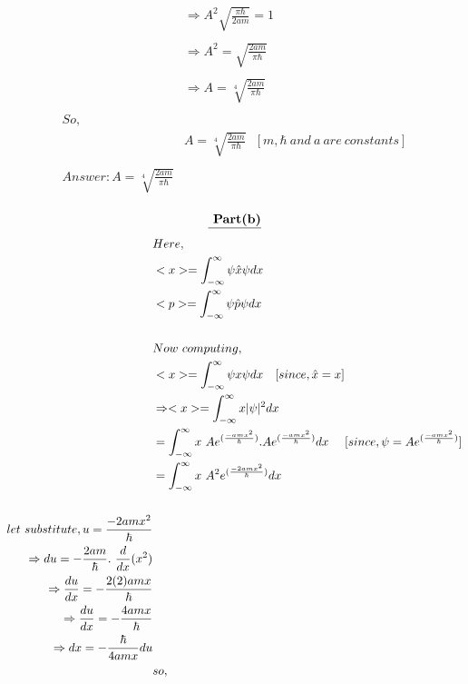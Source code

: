 \documentclass{article}
\begin{document}
\begin{homeworkProblem}
\newpage\vspace{5mm}
\hspace{20mm}
\large
\begin{align*}
  &\Rightarrow A^{2}  \sqrt{\frac{\pi \hbar}{2am}} =1\\\\
  &\Rightarrow A^{2}=  \sqrt{\frac{2am}{\pi \hbar}}\\\\
  &\Rightarrow A= \sqrt[4]{\frac{2am}{\pi \hbar}}\\\\
  So,\\
  &A =\sqrt[4]{\frac{2am}{\pi \hbar}}\ \ \ [ m, \hbar \ and \ a\ are \ constants ]\\\\
  Answer: A =\sqrt[4]{\frac{2am}{\pi \hbar}}\\\\
\end{align*}
\newpage\vspace{5mm}
    \[
    \textbf{\underline{ Part(b)}}
    \]
\hspace{20mm}
\begin{align*}
\large
  &Here,\\
  &<x> =\int_{-\infty}^{\infty}\psi \hat{x} \psi dx\\
  &<p> =\int_{-\infty}^{\infty}\psi \hat{ p} \psi dx\\\\
  &Now\ computing,\\
  &<x> =\int_{-\infty}^{\infty}\psi x \psi dx\ \ \ [since,\hat{x} = x]\\
  &\Rightarrow <x> =\int_{-\infty}^{\infty} x |\psi|^{2} dx\\
  &= \int_{-\infty}^{\infty}x\ A e^{( \frac{-amx^{2}}{\hbar})} . A e^{( \frac{-amx^{2}}{\hbar})} dx\ \ \ \ [since, \psi =A e^{( \frac{-amx^{2}}{\hbar})}]\\
   &= \int_{-\infty}^{\infty}x\ A^{2} e^{(\frac{-2amx^{2}}{\hbar})} dx \\\\
   let\ substitute,u = \frac{-2amx^{2}}{\hbar}\\
   \Rightarrow du =- \frac{2am}{\hbar}. \ \frac{d}{dx}(x^{2})\\
   \Rightarrow \frac{du}{dx} =-\frac{2(2)amx}{\hbar}\\
   \Rightarrow \frac{du}{dx} = -\frac{4amx}{\hbar}\\
   \Rightarrow dx= -\frac{\hbar}{4amx} du\\
   &so,\\

\end{align*}
\end{homeworkProblem}
\end{document}
